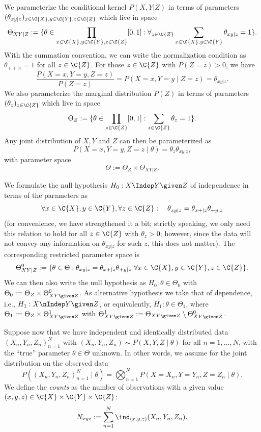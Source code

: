 We parameterize the conditional kernel $P(X,Y | Z)$ in terms of parameters
$(\theta_{xy|z})_{x\in\C{X},y\in\C{Y},z\in\C{Z}}$ which live in space
$$\Theta_{XY|Z} := %
\{ \theta \in \prod_{x\in\C{X},y\in\C{Y},z\in\C{Z}} [0,1] : \forall_{z\in\C{Z}} \sum_{x\in\C{X},y\in\C{Y}} \theta_{xy|z} = 1\}.$$
With the summation convention, we can write the normalization condition as $\theta_{++|z} = 1$ for all $z \in \C{Z}$.
For those $z\in\C{Z}$ with $P(Z = z) > 0$, we have 
$$\frac{P(X = x, Y = y, Z = z)}{P(Z=z)} = P(X = x, Y = y \mid Z=z) = \theta_{xy|z}.$$
We also parameterize the marginal distribution $P(Z)$ in terms of parameters
$(\theta_z)_{z\in\C{Z}}$ which live in space
$$\Theta_Z := \{ \theta \in \prod_{z\in\C{Z}} [0,1] : \sum_{z\in\C{Z}} \theta_z = 1\}.$$
Any joint distribution of $X,Y$ and $Z$ can then be parameterized as
$$P(X=x,Y=y,Z=z \mid \theta) = \theta_z \theta_{xy|z},$$
with parameter space
$$\Theta := \Theta_Z\times \Theta_{XY|Z}.$$

We formulate the null hypothesis $H_0 : X \Indep Y \given Z$ of independence
in terms of the parameters as
$$\forall x \in \C{X}, y \in \C{Y}, \forall z \in \C{Z}: \quad \theta_{xy|z} = \theta_{x+|z} \theta_{+ y|z}$$
(for convenience, we have strengthened it a bit; strictly speaking, we only need this relation to hold
for all $z \in \C{Z}$ with $\theta_z > 0$; however, since the data will not convey any information on $\theta_{xy|z}$
for such $z$, this does not matter).
The corresponding restricted parameter space is
$$\Theta_{XY|Z}^0 := \{\theta \in \Theta : \theta_{xy|z} = \theta_{x+|z} \theta_{+ y|z}\ \forall x \in \C{X}, y \in \C{Y}, z \in \C{Z}\}.$$
We can then also write the null hypothesis as $H_0 : \theta \in \Theta_0$ with
$\Theta_0 := \Theta_Z \times \Theta_{XY\given Z}^0$.
As alternative hypothesis we take that of dependence, i.e., $H_1 : X \nIndep Y \given Z$, or equivalently,
$H_1 : \theta \in \Theta_1$, where
$\Theta_1 := \Theta_Z \times \Theta_{XY\given Z}^1$ 
with $\Theta_{XY\given Z}^1 := \Theta_{XY\given Z} \setminus \Theta_{XY\given Z}^0$.

Suppose now that we have independent and identically distributed data $(X_n,Y_n,Z_n)_{n=1}^N$ with
$(X_n,Y_n,Z_n) \sim P(X,Y,Z \mid \theta)$ for all $n=1,\dots,N$, with the ``true'' parameter $\theta \in \Theta$
unknown.
In other words, we assume for the joint distribution on the observed data
$$P((X_n,Y_n,Z_n)_{n=1}^N \mid \theta) = \bigotimes_{n=1}^N P(X=X_n,Y=Y_n,Z=Z_n \mid \theta).$$
We define the \emph{counts} as the number of observations with a given value $(x,y,z)\in\C{X}\times\C{Y}\times\C{Z}$:
$$N_{xyz} := \sum_{n=1}^N \ind_{(x,y,z)}(X_n,Y_n,Z_n).$$

